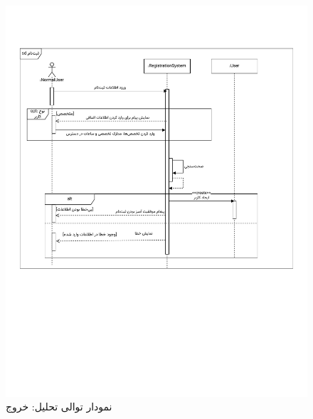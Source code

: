 \begin{figure}[ht!]
	\centering
	\includegraphics[scale=0.8, page=3]{figs/OOD-Sequence-1.pdf}
	\caption{نمودار توالی تحلیل: خروج}
\end{figure}
\FloatBarrier
\newpage

